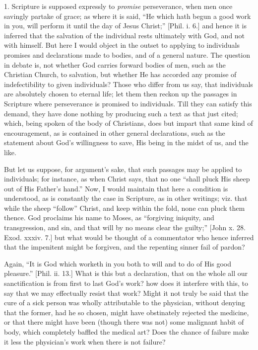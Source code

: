 1. Scripture is supposed expressly to \emph{promise} perseverance,
when men once savingly partake of grace; as where it is said, ``He
which hath begun a good work in you, will perform it until the day of
Jesus Christ;'' [Phil. i. 6.] and hence it is inferred that the salvation of the
individual rests ultimately with God, and not with himself. But here I
would object in the outset to applying to individuals promises and
declarations made to bodies, and of a general nature. The question in
debate is, not whether God carries forward bodies of men, such as the
Christian Church, to salvation, but whether He has accorded any promise
of indefectibility to given individuals? Those who differ from us say,
that individuals are absolutely chosen to eternal life; let them then
reckon up the passages in Scripture where perseverance is promised to
individuals. Till they can satisfy this demand, they have done nothing
by producing such a text as that just cited; which, being spoken of the
body of Christians, does but impart that same kind of encouragement, as
is contained in other general declarations, such as the statement about
God's willingness to save, His being in the midst of us, and the like.

But let us suppose, for argument's sake, that such passages may be
applied to individuals; for instance, as when Christ says, that no one
``shall pluck His sheep out of His Father's hand.'' Now, I would
maintain that here a condition is understood, as is constantly the case
in Scripture, as in other writings; viz. that while the sheep
``follow'' Christ, and keep within the fold, none can pluck them
thence. God proclaims his name to Moses, as ``forgiving iniquity,
and transgression, and sin, and that will by no means clear the
guilty;'' [John x. 28. Exod. xxxiv. 7.] but what would be thought of
a commentator who hence inferred that the impenitent might be forgiven,
and the repenting sinner fail of pardon?

Again, ``It is God which worketh in you both to will and to do of
His good pleasure.'' [Phil. ii. 13.] What is this but a declaration,
that on the whole all our sanctification is from first to last God's
work? how does it interfere with this, to say that we may effectually
resist that work? Might it not truly be said that the cure of a sick
person was wholly attributable to the physician, without denying that
the former, had he so chosen, might have obstinately rejected the
medicine, or that there might have been (though there was not) some
malignant habit of body, which completely baffled the medical art? Does
the chance of failure make it less the physician's work when there is
not failure?

